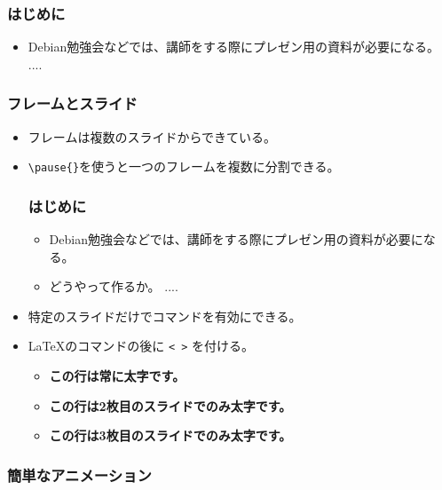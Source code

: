 \documentclass[mingoth,a4paper]{jsarticle}
\begin{document}
\begin{commandline}
\begin{itemize}
\begin{commandline}
\begin{frame}
\frametitle{はじめに}
\begin{itemize}
\item Debian勉強会などでは、講師をする際にプレゼン用の資料が必要になる。
  ....
\end{itemize}
\end{frame}
\end{commandline}

\end{itemize}


\subsubsection{フレームとスライド}

\begin{itemize}
\item フレームは複数のスライドからできている。
\item \verb|\pause{}|を使うと一つのフレームを複数に分割できる。

\begin{commandline}
\begin{frame}
\frametitle{はじめに}
\begin{itemize}
\item Debian勉強会などでは、講師をする際にプレゼン用の資料が必要になる。
\pause{}
\item どうやって作るか。
    ....
\end{itemize}
\end{frame}
\end{commandline}

\item 特定のスライドだけでコマンドを有効にできる。
\item \LaTeX{}のコマンドの後に \verb|< >| を付ける。

\begin{commandline}
\begin{itemize}
\item \textbf{この行は常に太字です。}
\item \textbf<2>{この行は2枚目のスライドでのみ太字です。}
\item \textbf<3>{この行は3枚目のスライドでのみ太字です。}
\end{itemize}
\end{commandline}

\end{itemize}


\subsubsection{簡単なアニメーション}



\end{commandline}
\end{document}
